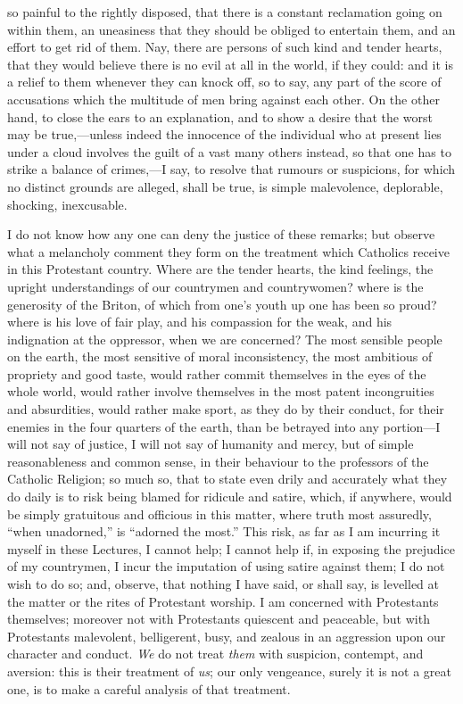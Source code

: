 so painful to the rightly disposed, that there is a
constant reclamation going on within them, an uneasiness
that they should be obliged to entertain them, and an effort to get rid of them. Nay, there are persons of such
kind and tender hearts, that they would believe there is
no evil at all in the world, if they could: and it is a
relief to them whenever they can knock off, so to say,
any part of the score of accusations which the multitude
of men bring against each other. On the other hand, to
close the ears to an explanation, and to show a desire
that the worst may be true,—unless indeed the
innocence of the individual who at present lies under a
cloud involves the guilt of a vast many others instead,
so that one has to strike a balance of crimes,—I
say, to resolve that rumours or suspicions, for which no
distinct grounds are alleged, shall be true, is simple
malevolence, deplorable, shocking, inexcusable.

I do not know how any one can deny the justice of
these remarks; but observe what a melancholy comment they
form on the treatment which Catholics receive in this
Protestant country. Where are the tender hearts, the kind
feelings, the upright understandings of our countrymen
and countrywomen? where is the generosity of the Briton,
of which from one's youth up one has been so proud? where
is his love of fair play, and his compassion for the
weak, and his indignation at the oppressor, when we are
concerned? The most sensible people on the earth, the
most sensitive of moral inconsistency, the most ambitious
of propriety and good taste, would rather commit
themselves in the eyes of the whole world, would rather
involve themselves in the most patent incongruities and
absurdities, would rather make sport, as they do by their
conduct, for their enemies in the four quarters of the
earth, than be betrayed into any portion—I will not
say of justice, I will not say of humanity and mercy, but
of simple reasonableness and common sense, in their
behaviour to the professors of the Catholic Religion; so
much so, that to state even drily and accurately what
they do daily is to risk being blamed for ridicule and
satire, which, if anywhere, would be simply gratuitous
and officious in this matter, where truth most assuredly,
``when unadorned,'' is ``adorned the
most.'' This risk, as far as I am incurring it myself
in these Lectures, I cannot help; I cannot help if, in
exposing the prejudice of my countrymen, I incur the
imputation of using satire against them; I do not wish to
do so; and, observe, that nothing I have said, or shall
say, is levelled at the matter or the rites of Protestant
worship. I am concerned with Protestants themselves;
moreover not with Protestants quiescent and peaceable,
but with Protestants malevolent, belligerent, busy, and
zealous in an aggression upon our character and conduct. \emph{We} do not treat \emph{them} with suspicion, contempt, and
aversion: this is their treatment of \emph{us}; our only
vengeance, surely it is not a great one, is to make a
careful analysis of that treatment.

